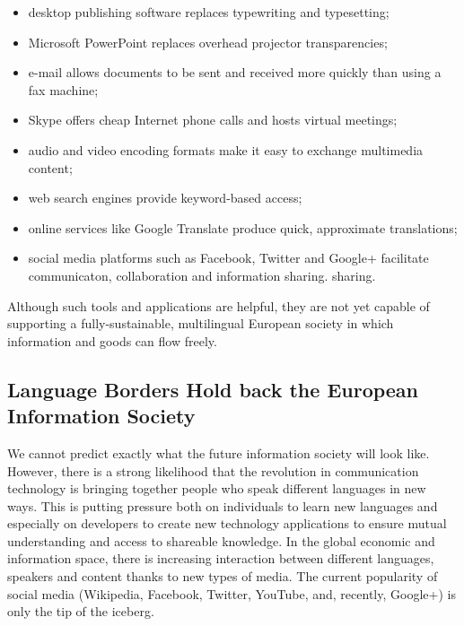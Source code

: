\begin{multicols}{2}
\begin{itemize}
\item desktop publishing software replaces typewriting and typesetting;
\item Microsoft PowerPoint replaces overhead projector transparencies;
\item e-mail allows documents to be sent and received more quickly than using a fax machine;
\item Skype offers cheap Internet phone calls and hosts virtual meetings;
\item audio and video encoding formats make it easy to exchange multimedia content;
\item web  search engines provide keyword-based access;
\item online services like Google Translate produce quick, approximate translations;
\item social media platforms such as Facebook, Twitter and Google+ facilitate communicaton, collaboration and information sharing.
 sharing.
\end{itemize}

Although such tools and applications are helpful, they are not yet capable of supporting a fully-sustainable, multilingual European society in which information and goods can flow freely.

\subsection[Language Borders Hold back the European Information Society]{Language Borders Hold back the European Information Society}

We cannot predict exactly what the future information society will look like. However, there is a strong likelihood that the revolution in communication technology is bringing together people who speak different languages in new ways. This is putting pressure both on individuals to learn new languages and especially on developers to create new technology applications to ensure mutual understanding and access to shareable knowledge. In the global economic and information space, there is increasing interaction between different languages, speakers and content thanks to new types of media. The current popularity of social media (Wikipedia, Facebook, Twitter, YouTube, and, recently, Google+) is only the tip of the iceberg.



\end{multicols}
